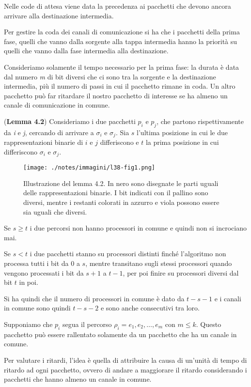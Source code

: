 Nelle code di attesa viene data la precedenza ai pacchetti che devono ancora arrivare alla destinazione intermedia.

Per gestire la coda dei canali di comunicazione si ha che i pacchetti della prima fase, quelli che vanno dalla sorgente alla tappa intermedia hanno la priorità su quelli che vanno dalla fase intermedia alla destinazione.

Consideriamo solamente il tempo necessario per la prima fase: la durata è data dal numero \emph{m} di bit diversi che ci sono tra la sorgente e la destinazione intermedia, più il numero di passi in cui il pacchetto rimane in coda. 
Un altro pacchetto può far ritardare il nostro pacchetto di interesse se ha almeno un canale di comunicazione in comune.

(\textbf{Lemma 4.2}) Consideriamo i due pacchetti $p_i$ e $p_j$, che partono rispettivamente da \emph{i} e \emph{j}, cercando di arrivare a $\sigma_i$ e $\sigma_j$.
Sia $s$ l'ultima posizione in cui le due rappresentazioni binarie di $i$ e $j$ differiscono e $t$ la prima posizione in cui differiscono $\sigma_i$ e $\sigma_j$.

\begin{figure}[htbp]
	\centering
	\texttt{[image: ./notes/immagini/l38-fig1.png]}
	\caption{Illustrazione del lemma 4.2. In nero sono disegnate le parti uguali delle rappresentazioni binarie. I bit indicati con il pallino sono diversi, mentre i restanti colorati in azzurro e viola possono essere sia uguali che diversi.}
\end{figure}

Se $s \geq t$ i due percorsi non hanno processori in comune e quindi non si incrociano mai.

Se $s  < t$ i due pacchetti stanno su processori distinti finché l'algoritmo non processa tutti i bit da $0$ a $s$, mentre transitano sugli stessi processori quando vengono processati i bit da $s+1$ a $t-1$, per poi finire su processori diversi dal bit $t$ in poi.

Si ha quindi che il numero di processori in comune è dato da $t - s - 1$ e i canali in comune sono quindi $t-s-2$ e sono anche consecutivi tra loro.

Supponiamo che $p_i$ segua il percorso $\rho_i = e_1, e_2, \ldots, e_m$ con $m \leq k$. 
Questo pacchetto può essere rallentato solamente da un pacchetto che ha un canale in comune.

Per valutare i ritardi, l'idea è quella di attribuire la causa di un'unità di tempo di ritardo ad ogni pacchetto, ovvero di andare a maggiorare il ritardo considerando i pacchetti che hanno almeno un canale in comune.


